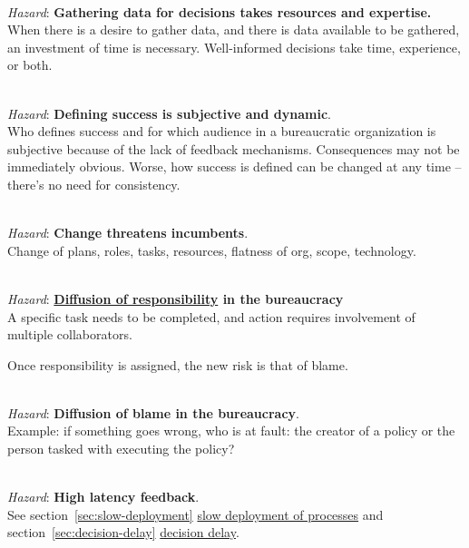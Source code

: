 \ \\

\textit{Hazard}: \textbf{Gathering data for decisions takes resources and expertise.}\\
When there is a desire to gather data, and there is data available to be gathered, an investment of time is necessary. Well-informed decisions take time, experience, or both.

\ \\

\textit{Hazard}: \textbf{Defining success is subjective and dynamic}. \\
Who defines success and for which audience in a bureaucratic organization is subjective because of the lack of feedback mechanisms. Consequences may not be immediately obvious. Worse, how success is defined can be changed at any time -- there's no need for consistency. 

\ \\

\textit{Hazard}: \textbf{Change threatens incumbents}. \\
Change of plans, roles, tasks, resources, flatness of org, scope, technology.

\ \\

\textit{Hazard}: \textbf{\href{https://en.wikipedia.org/wiki/Diffusion_of_responsibility}{Diffusion of responsibility} in the bureaucracy} \\
A specific task needs to be completed, and action requires involvement of multiple collaborators. 

Once responsibility is assigned, the new risk is that of blame.

\ \\

\textit{Hazard}: \textbf{Diffusion of blame in the bureaucracy}. \\
Example: if something goes wrong, who is at fault: the creator of a policy or the person tasked with executing the policy?

\ \\

\textit{Hazard}: \textbf{High latency feedback}. \\
See 
\ifsectionref
section~\ref{sec:slow-deployment} 
\fi
\hyperref[sec:slow-deployment]{slow deployment of processes} and 
\ifsectionref
section~\ref{sec:decision-delay} 
\fi
 \hyperref[sec:decision-delay]{decision delay}.

\ \\

